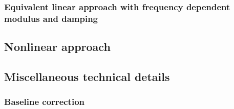\documentclass[11pt,letterpaper]{article}
\begin{document}





\subsubsection{Equivalent linear approach with frequency dependent modulus and damping}

\subsection{Nonlinear approach}\label{sec:nonlinear}

\subsection{Miscellaneous technical details}

\subsubsection{Baseline correction}\label{sec:baseline-correction}
\end{document}
